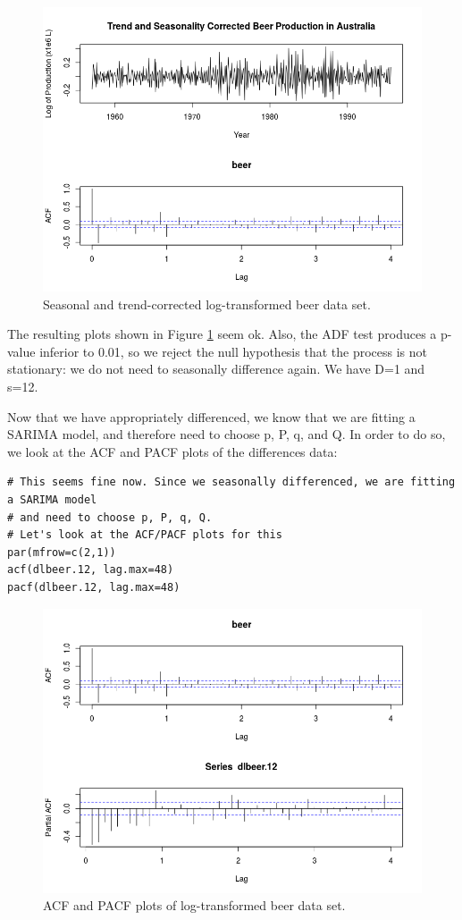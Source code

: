 \documentclass[]{article}
\begin{document}
\begin{figure}[!ht]
\centering
\includegraphics[width=.8\textwidth]{lbeerseas.png}
\caption{Seasonal and trend-corrected log-transformed beer data set.}
\label{lbeerseas}
\end{figure}

The resulting plots shown in Figure \ref{lbeerseas} seem ok. Also, the ADF test produces a p-value inferior to 0.01, so we reject the null hypothesis that the process is not stationary: we do not need to seasonally difference again. We have D=1 and s=12.

Now that we have appropriately differenced, we know that we are fitting a SARIMA model, and therefore need to choose p, P, q, and Q. In order to do so, we look at the ACF and PACF plots of the differences data:
\begin{Verbatim}[frame=single]
# This seems fine now. Since we seasonally differenced, we are fitting a SARIMA model
# and need to choose p, P, q, Q.
# Let's look at the ACF/PACF plots for this
par(mfrow=c(2,1))
acf(dlbeer.12, lag.max=48)
pacf(dlbeer.12, lag.max=48)
\end{Verbatim}

\begin{figure}[!ht]
\centering
\includegraphics[width=.8\textwidth]{lbeeracfpacf.png}
\caption{ACF and PACF plots of log-transformed beer data set.}
\label{lbeeracfpacf}
\end{figure}
\end{document}

